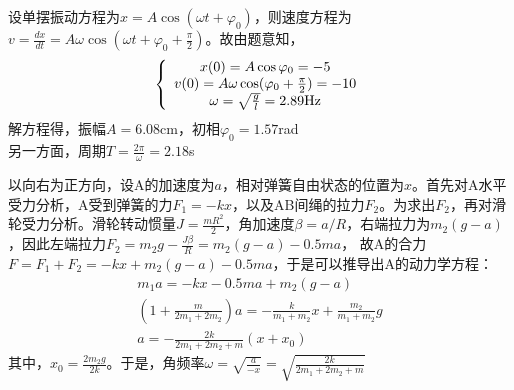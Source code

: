 \exercise

\solve
设单摆振动方程为$x=A\cos(\omega t+\varphi_0)$，则速度方程为$v=\frac{dx}{dt}=A\omega\cos(\omega t+\varphi_0+\frac{\pi}{2})$。故由题意知，
\begin{equation*}
  \left\{
   \begin{array}{c}
   x(0)=A\cos{\varphi_0} = -5  \\
   v(0)=A\omega\cos(\varphi_0+\frac{\pi}{2}) = -10  \\
   \omega=\sqrt{\frac{g}{l}}=2.89{\rm Hz}   \\
   \end{array}
  \right.
\end{equation*}
解方程得，振幅$A=6.08$cm，初相${\varphi_0}=1.57$rad\\
另一方面，周期$T=\frac{2\pi}{\omega}=2.18$s

\exercise

\solve
以向右为正方向，设A的加速度为$a$，相对弹簧自由状态的位置为$x$。首先对A水平受力分析，A受到弹簧的力$F_1=-kx$，以及AB间绳的拉力$F_2$。为求出$F_2$，再对滑轮受力分析。滑轮转动惯量$J=\frac{mR^2}{2}$，角加速度$\beta=a/R$，右端拉力为$m_2(g-a)$，因此左端拉力$F_2=m_2g-\frac{J\beta}{R}=m_2(g-a)-0.5ma$，
故A的合力$F=F_1+F_2=-kx+m_2(g-a)-0.5ma$，于是可以推导出A的动力学方程：
\begin{gather*}
m_1a=-kx-0.5ma+m_2(g-a)\\
(1+\frac{m}{2m_1+2m_2})a=-\frac{k}{m_1+m_2}x+\frac{m_2}{m_1+m_2}g\\
a=-\frac{2k}{2m_1+2m_2+m}(x+x_0)
\end{gather*}
其中，$x_0=\frac{2m_2g}{2k}$。于是，角频率$\omega=\sqrt{\frac{a}{-x}}=\sqrt{\frac{2k}{2m_1+2m_2+m}}$
